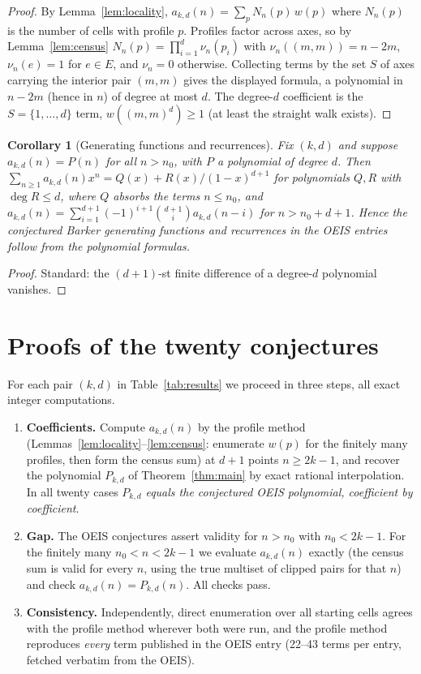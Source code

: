 \documentclass[11pt]{article}
\newtheorem{corollary}[theorem]{Corollary}
\begin{document}
\begin{proof}
By Lemma~\ref{lem:locality}, $a_{k,d}(n) = \sum_{p} N_n(p)\, w(p)$ where
$N_n(p)$ is the number of cells with profile $p$.  Profiles factor across
axes, so by Lemma~\ref{lem:census}
$N_n(p) = \prod_{i=1}^d \nu_n(p_i)$ with $\nu_n((m,m)) = n-2m$,
$\nu_n(e) = 1$ for $e \in E$, and $\nu_n = 0$ otherwise.  Collecting
terms by the set $S$ of axes carrying the interior pair $(m,m)$ gives the
displayed formula, a polynomial in $n-2m$ (hence in $n$) of degree at
most $d$.  The degree-$d$ coefficient is the $S = \{1,\dots,d\}$ term,
$w((m,m)^d) \ge 1$ (at least the straight walk exists).
\end{proof}

\begin{corollary}[Generating functions and recurrences]\label{cor:gf}
Fix $(k,d)$ and suppose $a_{k,d}(n) = P(n)$ for all $n > n_0$, with
$P$ a polynomial of degree $d$.  Then $\sum_{n\ge1} a_{k,d}(n) x^n = Q(x) + R(x)/(1-x)^{d+1}$ for
polynomials $Q, R$ with $\deg R \le d$, where $Q$ absorbs the terms
$n \le n_0$, and
$a_{k,d}(n) = \sum_{i=1}^{d+1} (-1)^{i+1}\binom{d+1}{i} a_{k,d}(n-i)$
for $n > n_0 + d + 1$.  Hence the conjectured Barker generating functions
and recurrences in the OEIS entries follow from the polynomial formulas.
\end{corollary}

\begin{proof}
Standard: the $(d{+}1)$-st finite difference of a degree-$d$ polynomial
vanishes.
\end{proof}

\section{Proofs of the twenty conjectures}\label{sec:results}

For each pair $(k,d)$ in Table~\ref{tab:results} we proceed in three
steps, all exact integer computations.

\begin{enumerate}
\item \textbf{Coefficients.}  Compute $a_{k,d}(n)$ by the profile method
  (Lemmas~\ref{lem:locality}--\ref{lem:census}: enumerate $w(p)$ for the
  finitely many profiles, then form the census sum) at $d+1$ points
  $n \ge 2k-1$, and recover the polynomial $P_{k,d}$ of
  Theorem~\ref{thm:main} by exact rational interpolation.  In all twenty
  cases $P_{k,d}$ \emph{equals the conjectured OEIS polynomial,
  coefficient by coefficient}.
\item \textbf{Gap.}  The OEIS conjectures assert validity for
  $n > n_0$ with $n_0 < 2k-1$.  For the finitely many
  $n_0 < n < 2k-1$ we evaluate $a_{k,d}(n)$ exactly (the census sum is
  valid for every $n$, using the true multiset of clipped pairs for that
  $n$) and check $a_{k,d}(n) = P_{k,d}(n)$.  All checks pass.
\item \textbf{Consistency.}  Independently, direct enumeration over all
  starting cells agrees with the profile method wherever both were run,
  and the profile method reproduces \emph{every} term published in the
  OEIS entry (22--43 terms per entry, fetched verbatim from the OEIS).
\end{enumerate}
\end{document}
